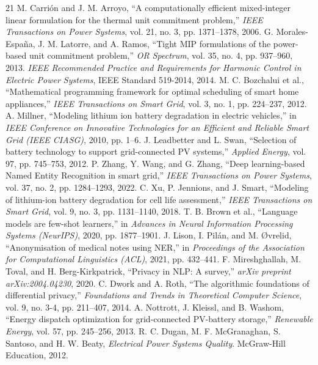 \documentclass[journal]{IEEEtran}
\begin{document}
\begin{thebibliography}{21}
 M. Carri{\'o}n and J. M. Arroyo, ``A computationally efficient mixed-integer linear formulation for the thermal unit commitment problem,'' \emph{IEEE Transactions on Power Systems}, vol. 21, no. 3, pp. 1371--1378, 2006.
 G. Morales-Espa{\~n}a, J. M. Latorre, and A. Ramos, ``Tight MIP formulations of the power-based unit commitment problem,'' \emph{OR Spectrum}, vol. 35, no. 4, pp. 937--960, 2013.
 \emph{IEEE Recommended Practice and Requirements for Harmonic Control in Electric Power Systems}, IEEE Standard 519-2014, 2014.
 M. C. Bozchalui et al., ``Mathematical programming framework for optimal scheduling of smart home appliances,'' \emph{IEEE Transactions on Smart Grid}, vol. 3, no. 1, pp. 224--237, 2012.
 A. Millner, ``Modeling lithium ion battery degradation in electric vehicles,'' in \emph{IEEE Conference on Innovative Technologies for an Efficient and Reliable Smart Grid (IEEE CIASG)}, 2010, pp. 1--6.
 J. Leadbetter and L. Swan, ``Selection of battery technology to support grid-connected PV systems,'' \emph{Applied Energy}, vol. 97, pp. 745--753, 2012.
 P. Zhang, Y. Wang, and G. Zhang, ``Deep learning-based Named Entity Recognition in smart grid,'' \emph{IEEE Transactions on Power Systems}, vol. 37, no. 2, pp. 1284--1293, 2022.
 C. Xu, P. Jennions, and J. Smart, ``Modeling of lithium-ion battery degradation for cell life assessment,'' \emph{IEEE Transactions on Smart Grid}, vol. 9, no. 3, pp. 1131--1140, 2018.
 T. B. Brown et al., ``Language models are few-shot learners,'' in \emph{Advances in Neural Information Processing Systems (NeurIPS)}, 2020, pp. 1877--1901.
 J. Lison, I. Pil{\'a}n, and M. {\O}vrelid, ``Anonymisation of medical notes using NER,'' in \emph{Proceedings of the Association for Computational Linguistics (ACL)}, 2021, pp. 432--441.
 F. Mireshghallah, M. Toval, and H. Berg-Kirkpatrick, ``Privacy in NLP: A survey,'' \emph{arXiv preprint arXiv:2004.04230}, 2020.
 C. Dwork and A. Roth, ``The algorithmic foundations of differential privacy,'' \emph{Foundations and Trends in Theoretical Computer Science}, vol. 9, no. 3-4, pp. 211--407, 2014.
 A. Nottrott, J. Kleissl, and B. Washom, ``Energy dispatch optimization for grid-connected PV-battery storage,'' \emph{Renewable Energy}, vol. 57, pp. 245--256, 2013.
 R. C. Dugan, M. F. McGranaghan, S. Santoso, and H. W. Beaty, \emph{Electrical Power Systems Quality}. McGraw-Hill Education, 2012.

\end{thebibliography}
\end{document}
